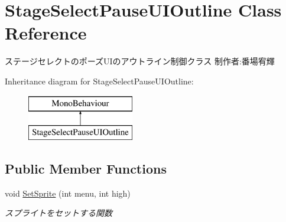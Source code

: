 \hypertarget{class_stage_select_pause_u_i_outline}{}\section{Stage\+Select\+Pause\+U\+I\+Outline Class Reference}
\label{class_stage_select_pause_u_i_outline}


ステージセレクトのポーズ\+U\+Iのアウトライン制御クラス 制作者\+:番場宥輝  


Inheritance diagram for Stage\+Select\+Pause\+U\+I\+Outline\+:\begin{figure}[H]
\begin{center}
\leavevmode
\includegraphics[height=2.000000cm]{class_stage_select_pause_u_i_outline}
\end{center}
\end{figure}
\subsection*{Public Member Functions}
\begin{DoxyCompactItemize}
\item 
void \hyperlink{class_stage_select_pause_u_i_outline_a7a067fec10f43b15167a325f142cdb45}{Set\+Sprite} (int menu, int high)
\begin{DoxyCompactList}\small\item\em スプライトをセットする関数 \end{DoxyCompactList}\end{DoxyCompactItemize}
